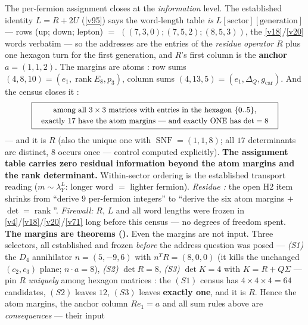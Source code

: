\documentclass[11pt,a4paper]{article}
\newcommand{\gcar}{g_{\mathrm{car}}}
\begin{document}
\begin{keybox}
The per-fermion assignment closes at the \emph{information} level. The established identity
$L=R+2U$ (\vref{v95}) says the word-length table \emph{is} $L[\text{sector}][\text{generation}]$ --- rows
(up; down; lepton) $=$ $((7,3,0);(7,5,2);(8,5,3))$, the \vref{v18}/\vref{v20} words verbatim --- so the addresses are
the entries of the \emph{residue operator} $R$ plus one hexagon turn for the first generation, and
$R$'s first column is the \textbf{anchor} $a=(1,1,2)$. The margins are atoms \mE: row sums
$(4,8,10)=(e_1,\operatorname{rank}E_8,p_3)$, column sums $(4,13,5)=(e_1,\Delta_Q,\gcar)$. And the
census closes it \mE:
\[
  \boxed{\ \begin{array}{c}
  \text{\small among all $3\times3$ matrices with entries in the hexagon $\{0..5\}$,}\\[1pt]
  \text{\small exactly $17$ have the atom margins --- and exactly ONE has $\det=8$}
  \end{array}\ }
\]
--- and it is $R$ (also the unique one with $\operatorname{SNF}=(1,1,8)$; all $17$ determinants are
distinct, $8$ occurs once --- control computed explicitly). \textbf{The assignment table carries zero
residual information beyond the atom margins and the rank determinant.} Within-sector ordering is the
established transport reading ($m\sim\lambda_Y^L$: longer word $=$ lighter fermion). \emph{Residue
\mC:} the open H2 item shrinks from ``derive $9$ per-fermion integers'' to ``derive the six atom
margins $+$ $\det=\operatorname{rank}$''. \emph{Firewall:} $R$, $L$ and all word lengths were frozen in
\vref{v4}/\vref{v18}/\vref{v20}/\vref{v71} long before this census --- no degrees of freedom spent.
\smallskip\\
\noindent\textbf{The margins are theorems ().} Even the margins are not
input. Three selectors, all established and frozen \emph{before} the address question was posed ---
\emph{(S1)} the $D_4$ annihilator $n=(5,-9,6)$ with $n^TR=(8,0,0)$ (it kills the unchanged
$(c_2,c_3)$ plane; $n\!\cdot\!a=8$), \emph{(S2)} $\det R=8$, \emph{(S3)} $\det K=4$ with $K=R+Q\Sigma$
--- pin $R$ \emph{uniquely} among hexagon matrices \mE: the $(S1)$ census has $4\times4\times4=64$
candidates, $(S2)$ leaves $12$, $(S3)$ leaves \textbf{exactly one}, and it is $R$. Hence the atom
margins, the anchor column $Re_1=a$ and all sum rules above are \emph{consequences} --- their input

\end{keybox}
\end{document}
